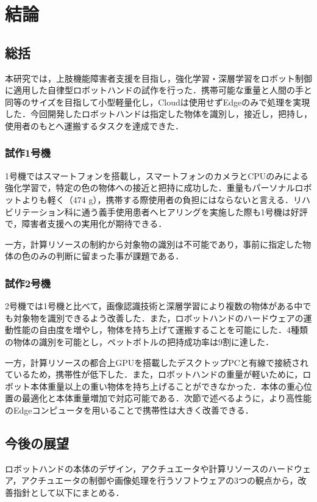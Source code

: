 \chapter{結論}
\newpage

\section{総括}
本研究では，上肢機能障害者支援を目指し，強化学習・深層学習をロボット制御に適用した自律型ロボットハンドの試作を行った．携帯可能な重量と人間の手と同等のサイズを目指して小型軽量化し，Cloudは使用せずEdgeのみで処理を実現した．今回開発したロボットハンドは指定した物体を識別し，接近し，把持し，使用者のもとへ運搬するタスクを達成できた．

\subsection*{試作1号機}
1号機ではスマートフォンを搭載し，スマートフォンのカメラとCPUのみによる強化学習で，特定の色の物体への接近と把持に成功した．重量もパーソナルロボットよりも軽く（474 g），携帯する際使用者の負担にはならないと言える．リハビリテーション科に通う義手使用患者へヒアリングを実施した際も1号機は好評で，障害者支援への実用化が期待できる．

一方，計算リソースの制約から対象物の識別は不可能であり，事前に指定した物体の色のみの判断に留まった事が課題である．

\subsection*{試作2号機}
2号機では1号機と比べて，画像認識技術と深層学習により複数の物体がある中でも対象物を識別できるよう改善した．また，ロボットハンドのハードウェアの運動性能の自由度を増やし，物体を持ち上げて運搬することを可能にした．4種類の物体の識別を可能とし，ペットボトルの把持成功率は9割に達した．

一方，計算リソースの都合上GPUを搭載したデスクトップPCと有線で接続されているため，携帯性が低下した．また，ロボットハンドの重量が軽いために，ロボット本体重量以上の重い物体を持ち上げることができなかった．本体の重心位置の最適化と本体重量増加で対応可能である．次節で述べるように，より高性能のEdgeコンピュータを用いることで携帯性は大きく改善できる．


\section{今後の展望}\label{sec:今後の展望}
ロボットハンドの本体のデザイン，アクチュエータや計算リソースのハードウェア，アクチュエータの制御や画像処理を行うソフトウェアの3つの観点から，改善指針として以下にまとめる．

